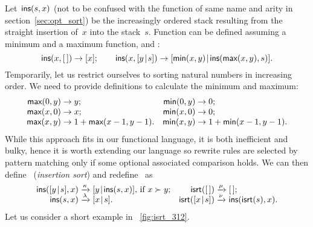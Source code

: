 Let~\(\textsf{ins}(s,x)\) (not to be confused with
the function of same name and arity in section~\ref{sec:opt_sort}) be
the increasingly ordered stack resulting from the straight insertion
of~\(x\) into the stack~\(s\). Function  can be defined
assuming a minimum and a maximum function,
 and
:
\begin{equation*}
\textsf{ins}(x,[\,])         \rightarrow [x];\qquad
\textsf{ins}(x,[{y}\!\mid\!{s}]) \rightarrow
   [{\textsf{min}(x,y)}\!\mid\!{\textsf{ins}(\textsf{max}(x,y),s)}].
\end{equation*}
Temporarily, let us restrict ourselves to sorting natural numbers in
increasing order. We need to provide definitions to calculate the
minimum and maximum:
\begin{equation*}
\begin{array}{@{}r@{\;}l@{\;}lr@{\;}l@{\;}l@{}}
  \fun{max}(0,y) & \rightarrow & y; & \fun{min}(0,y) & \rightarrow & 0;\\
  \fun{max}(x,0) & \rightarrow & x; & \fun{min}(x,0) & \rightarrow & 0;\\
  \fun{max}(x,y) & \rightarrow & 1 + \fun{max}(x-1,y-1).
& \fun{min}(x,y) & \rightarrow & 1 + \fun{min}(x-1,y-1).
\end{array}
\end{equation*}
While this approach fits in our functional language, it is both
inefficient and bulky, hence it is worth extending our language so
rewrite rules are selected by pattern matching only if some optional
associated comparison holds. We can then
define~ (\emph{insertion sort})
and redefine~ as
\begin{equation*}
\begin{array}{@{}r@{\;}l@{\;}lr@{\;}l@{\;}l@{}}
  \fun{ins}(\cons{y}{s},x)
& \smashedrightarrow{\kappa}
& \cons{y}{\fun{ins}(s,x)}, \,\text{if \(x \succ y\)};
& \fun{isrt}(\el)
& \smashedrightarrow{\mu}
& \el;\\
  \fun{ins}(s,x)
& \smashedrightarrow{\lambda}
& \cons{x}{s}.
& \fun{isrt}(\cons{x}{s})
& \smashedrightarrow{\nu}
& \fun{ins}(\fun{isrt}(s),x).
\end{array}
\end{equation*}
Let us consider a short example in \fig~\vref{fig:isrt_312}.

